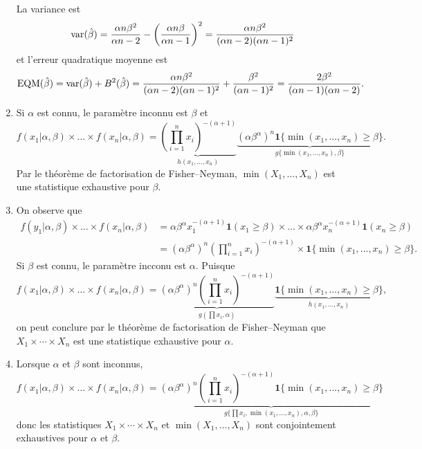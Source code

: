 \begin{solution}{3.10}
\begin{enumerate}
La variance est
$$
\operatorname{var}(\hat\beta)= \frac{\alpha n\beta^2}{\alpha n-2}-\left(\frac{\alpha n\beta}{\alpha n-1}\right)^2 = \frac{\alpha n\beta^2}{(\alpha n-2)(\alpha n-1)^2}
$$
et l'erreur quadratique moyenne est
$$
\mbox{EQM}(\hat\beta)=\operatorname{var}(\hat\beta)+B^2(\hat\beta)= \frac{\alpha n\beta^2}{(\alpha n-2)(\alpha n-1)^2}+\frac{\beta^2}{(\alpha n -1)^2}=\frac{2\beta^2}{(\alpha n-1)(\alpha n-2)}.
$$

\item Si $\alpha$ est connu, le paramètre inconnu est $\beta$ et
$$
f(x_1|\alpha,\beta) \times \dots \times f(x_n|\alpha,\beta)  =\underbrace{ \left(\prod_{i=1}^n x_i\right)^{-(\alpha+1)}}_{h(x_1, \dots, x_n)} \underbrace{(\alpha \beta^\alpha)^n\mathbf{1} \{ \min(x_1,\dots, x_n) \ge \beta\} }_{g\{ \min(x_1,\dots, x_n), \beta \}}.
$$
Par le théorème de factorisation de Fisher--Neyman, $\min(X_1,\dots, X_n)$ est une statistique exhaustive pour $\beta$.

\item On observe que
\begin{align*}
f(y_1|\alpha,\beta) \times \dots \times f(x_n|\alpha,\beta)  & = \alpha\beta^{\alpha}x_1^{-(\alpha+1)} \mathbf{1}(x_1 \ge \beta)\times \dots \times \alpha\beta^{\alpha} x_n^{-(\alpha+1)} \mathbf{1}(x_n \ge \beta)\\
& = (\alpha \beta^\alpha)^n \left(\prod_{i=1}^n x_i\right)^{-(\alpha+1)} \times \mathbf{1} \{ \min(x_1,\dots, x_n) \ge \beta\}.
\end{align*}
Si $\beta$ est connu, le paramètre incconu est $\alpha$. Puisque
$$
f(x_1|\alpha,\beta) \times \dots \times f(x_n|\alpha,\beta)  =\underbrace{(\alpha \beta^\alpha)^n \left(\prod_{i=1}^n x_i\right)^{-(\alpha+1)}}_{g(\prod x_i , \alpha)} \underbrace{\mathbf{1} \{ \min(x_1,\dots, x_n) \ge \beta\}}_{h(x_1,\dots, x_n)},
$$
on peut conclure par le théorème de factorisation de Fisher--Neyman que $X_1 \times \cdots \times X_n$ est une statistique exhaustive pour $\alpha$.

\item Lorsque $\alpha$ et $\beta$ sont inconnus,
$$
f(x_1|\alpha,\beta) \times \dots \times f(x_n|\alpha,\beta)  =\underbrace{(\alpha \beta^\alpha)^n \left(\prod_{i=1}^n x_i\right)^{-(\alpha+1)}\mathbf{1} \{ \min(x_1,\dots, x_n) \ge \beta\}}_{g\{\prod x_i, \min(x_1,\dots, x_n), \alpha,\beta\}}
$$
donc les statistiques $X_1 \times \cdots \times X_n$ et $\min(X_1,\dots, X_n)$ sont conjointement exhaustives pour $\alpha$ et $\beta$.
\end{enumerate}
\end{solution}
